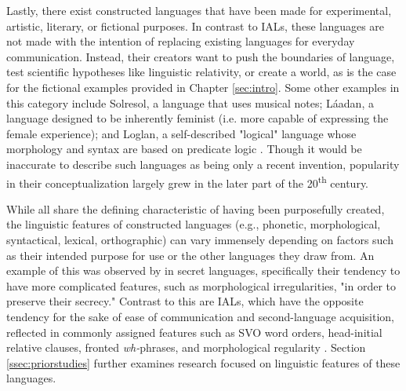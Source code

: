 \documentclass[12pt,a4paper]{article}
\numberwithin{figure}{section}
\numberwithin{table}{section}
\numberwithin{definition}{section}
\begin{document}



Lastly, there exist constructed languages that have been made for experimental, artistic, literary, or fictional purposes. In contrast to IALs, these languages are not made with the intention of replacing existing languages for everyday communication. Instead, their creators want to push the boundaries of language, test scientific hypotheses like linguistic relativity, or create a world, as is the case for the fictional examples provided in Chapter \ref{sec:intro}. Some other examples in this category include Solresol, a language that uses musical notes; Láadan, a language designed to be inherently feminist (i.e. more capable of expressing the female experience); and Loglan, a self-described "logical" language whose morphology and syntax are based on predicate logic \parencite{Adelman2014article}. Though it would be inaccurate to describe such languages as being only a recent invention, popularity in their conceptualization largely grew in the later part of the 20\textsuperscript{th} century.

While all share the defining characteristic of having been purposefully created, the linguistic features of constructed languages (e.g., phonetic, morphological, syntactical, lexical, orthographic) can vary immensely depending on factors such as their intended purpose for use or the other languages they draw from. An example of this was observed by \textcite{Gobbo2016article} in secret languages, specifically their tendency to have more complicated features, such as morphological irregularities, "in order to preserve their secrecy." Contrast to this are IALs, which have the opposite tendency for the sake of ease of communication and second-language acquisition, reflected in commonly assigned features such as SVO word orders, head-initial relative clauses, fronted \textit{wh-}phrases, and morphological regularity \parencite{goodall2022article,Gobbo2016article}. Section \ref{ssec:priorstudies} further examines research focused on linguistic features of these languages. 
\end{document}
